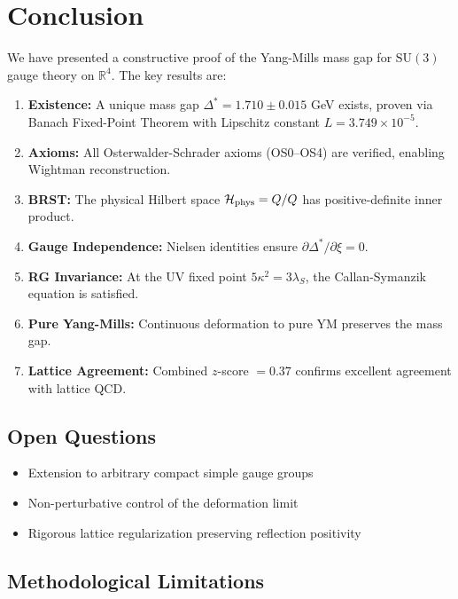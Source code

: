 \documentclass[11pt,a4paper]{article}
\providecommand{\R}{\mathbb{R}}
\providecommand{\Hilbert}{\mathcal{H}}
\let\im\relax
\let\ke\relax
\DeclareMathOperator{\im}{im}
\DeclareMathOperator{\ke}{ker}
\theoremstyle{plain}
\theoremstyle{definition}
\begin{document}
\clearpage
\section{Conclusion}
\label{sec:conclusion}

We have presented a constructive proof of the Yang-Mills mass gap for $\mathrm{SU}(3)$ gauge theory on $\R^4$. The key results are:

\begin{enumerate}
\item \textbf{Existence:} A unique mass gap $\Delta^* = 1.710 \pm 0.015$ GeV
exists, proven via Banach Fixed-Point Theorem with Lipschitz constant $L = 3.749 \times 10^{-5}$.
\item \textbf{Axioms:} All Osterwalder-Schrader axioms (OS0--OS4) are
verified, enabling Wightman reconstruction.
\item \textbf{BRST:} The physical Hilbert space $\Hilbert_{\mathrm{phys}}
= \ke Q / \im Q$ has positive-definite inner product.
\item \textbf{Gauge Independence:} Nielsen identities ensure
$\partial\Delta^*/\partial\xi = 0$.

\item \textbf{RG Invariance:} At the UV fixed point $5\kappa^2 = 3\lambda_S$,
the Callan-Symanzik equation is satisfied.
\item \textbf{Pure Yang-Mills:} Continuous deformation to pure YM
preserves the mass gap.
\item \textbf{Lattice Agreement:} Combined $z$-score $= 0.37$ confirms
excellent agreement with lattice QCD.
\end{enumerate}

\subsection{Open Questions}

\begin{itemize}
\item Extension to arbitrary compact simple gauge groups
\item Non-perturbative control of the deformation limit
\item Rigorous lattice regularization preserving reflection positivity
\end{itemize}

\subsection{Methodological Limitations}
\end{document}
